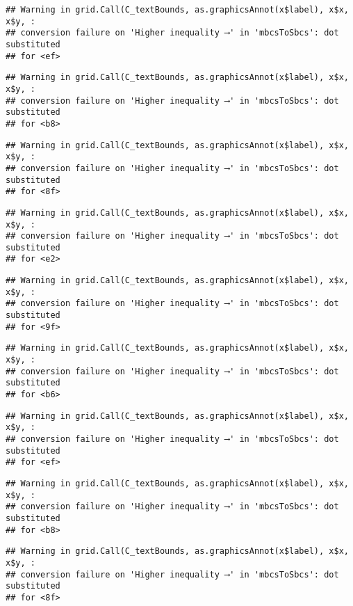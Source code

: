\documentclass[
]{article}
\begin{document}
\begin{verbatim}
## Warning in grid.Call(C_textBounds, as.graphicsAnnot(x$label), x$x, x$y, :
## conversion failure on 'Higher inequality ⟶️' in 'mbcsToSbcs': dot substituted
## for <ef>
\end{verbatim}

\begin{verbatim}
## Warning in grid.Call(C_textBounds, as.graphicsAnnot(x$label), x$x, x$y, :
## conversion failure on 'Higher inequality ⟶️' in 'mbcsToSbcs': dot substituted
## for <b8>
\end{verbatim}

\begin{verbatim}
## Warning in grid.Call(C_textBounds, as.graphicsAnnot(x$label), x$x, x$y, :
## conversion failure on 'Higher inequality ⟶️' in 'mbcsToSbcs': dot substituted
## for <8f>
\end{verbatim}

\begin{verbatim}
## Warning in grid.Call(C_textBounds, as.graphicsAnnot(x$label), x$x, x$y, :
## conversion failure on 'Higher inequality ⟶️' in 'mbcsToSbcs': dot substituted
## for <e2>
\end{verbatim}

\begin{verbatim}
## Warning in grid.Call(C_textBounds, as.graphicsAnnot(x$label), x$x, x$y, :
## conversion failure on 'Higher inequality ⟶️' in 'mbcsToSbcs': dot substituted
## for <9f>
\end{verbatim}

\begin{verbatim}
## Warning in grid.Call(C_textBounds, as.graphicsAnnot(x$label), x$x, x$y, :
## conversion failure on 'Higher inequality ⟶️' in 'mbcsToSbcs': dot substituted
## for <b6>
\end{verbatim}

\begin{verbatim}
## Warning in grid.Call(C_textBounds, as.graphicsAnnot(x$label), x$x, x$y, :
## conversion failure on 'Higher inequality ⟶️' in 'mbcsToSbcs': dot substituted
## for <ef>
\end{verbatim}

\begin{verbatim}
## Warning in grid.Call(C_textBounds, as.graphicsAnnot(x$label), x$x, x$y, :
## conversion failure on 'Higher inequality ⟶️' in 'mbcsToSbcs': dot substituted
## for <b8>
\end{verbatim}

\begin{verbatim}
## Warning in grid.Call(C_textBounds, as.graphicsAnnot(x$label), x$x, x$y, :
## conversion failure on 'Higher inequality ⟶️' in 'mbcsToSbcs': dot substituted
## for <8f>
\end{verbatim}
\end{document}

